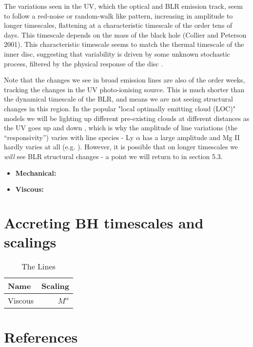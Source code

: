 \documentclass[11pt]{article}
\begin{document}
The variations seen in the UV, which the optical and BLR emission track, seem to follow a red-noise or random-walk like pattern, increasing in amplitude to longer timescales, flattening at a characteristic timescale of the order tens of days. This timescale depends on the mass of the black hole (Collier and Peterson 2001). This characteristic timescale seems to match the thermal timescale of the inner disc, suggesting that variability is driven by some unknown stochastic process, filtered by the physical response of the disc \citep{Kelly2009, Kelly2011}.

Note that the changes we see in broad emission lines are also of the order weeks, tracking the changes in the UV photo-ionising source. This is much shorter than the dynamical timescale of the BLR, and means we are not seeing structural changes in this region. In the popular "local optimally emitting cloud (LOC)" models we will be lighting up different pre-existing clouds at different distances as the UV goes up and down \citep{Peterson2006,Goad2014}, which is why the amplitude of line variations (the ``responsivity'') varies with line species - Ly $\alpha$ has a large amplitude and Mg II hardly varies at all (e.g. \citet{Cackett2015}). However, it is possible that on longer timescales we {\em will} see BLR structural changes - a point we will return to in section 5.3.

\begin{itemize}
\item{  {\bf Mechanical:} }
\item{  {\bf Viscous:} }
\end{itemize}

\citet{Croom04}
\noindent

\section{Accreting BH timescales and scalings}


\begin{table}
  \caption{The Lines}
  \label{tab:the_lines}
  \begin{center}
    \begin{tabular}{lr} 
      \hline
      \hline
      Name & Scaling \\ 
      \hline
      Viscous & $M^{\alpha}$ \\
     \hline
      \hline
   \end{tabular}
  \end{center}
\end{table}



\section{References}




\end{document}
